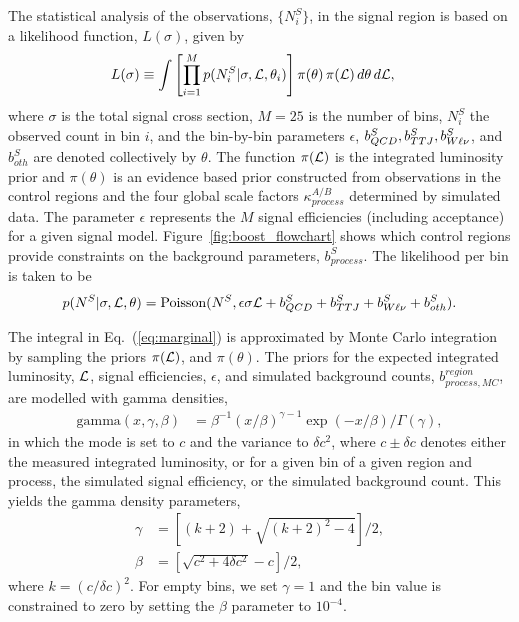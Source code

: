 
The statistical analysis of the observations,  $\{ N^S_i \}$, in the signal region is based on a
likelihood function, $L(\sigma)$, given by
\begin{align}
  L(\sigma) & \equiv  \int   \left[ \prod_{i=1}^M p(N^S_i | \sigma, {\cal L}, \theta_i)  \right] 
\pi(\theta) \, \pi({\cal L}) \, d\theta \, d{\cal L},
\label{eq:marginal}
\end{align}
where $\sigma$ is the total signal cross section, $M = 25$ is the number of bins, $N^S_i$ the
observed count in bin $i$, and the bin-by-bin parameters  $\epsilon$,  $b^S_{QCD}, b^S_{TTJ},
b^S_{W\ell\nu}$, and $b^S_{oth}$ are  denoted collectively by $\theta$. 
The function $\pi({\cal L})$ is the integrated luminosity prior and $\pi(\theta)$ is an evidence
based prior constructed from observations in the control regions and the four global scale factors
$\kappa^{A/B}_{process}$ determined by simulated data. 
The parameter $\epsilon$ represents the $M$ signal efficiencies (including acceptance) for a given
signal model. Figure~\ref{fig:boost_flowchart} shows which control regions provide constraints on
the background parameters, $b^S_{process}$.
The likelihood per bin is taken to be
\begin{equation}
 p(N^S | \sigma, {\cal L}, \theta) = \textrm{Poisson}(N^S,  \epsilon \sigma {\cal L} + b^S_{QCD} +
b^S_{TTJ} + b^S_{W\ell\nu} +  b^{S}_{oth}) .
\end{equation}

The integral in Eq.~(\ref{eq:marginal}) is approximated by Monte Carlo integration by sampling
 the priors $\pi({\cal L})$, and  $\pi(\theta)$. 
The priors for the expected integrated luminosity, ${\cal L}$, signal efficiencies, $\epsilon$, and 
simulated background counts, $b^{region}_{process, MC}$, are modelled with gamma densities,
\begin{align}
\textrm{gamma}(x, \gamma, \beta) &= \beta^{-1}(x/\beta)^{\gamma-1} \exp(-x / \beta) /
\Gamma(\gamma),
\label{eq:gamma}
\end{align}
in which the mode is set to $c$ and the variance to $\delta c^2$, 
where $c \pm \delta c$ denotes either the measured integrated luminosity, or for a given bin of
a given region and process, the simulated signal efficiency, or the simulated background count. This
yields the gamma density parameters,
\begin{align}
   \gamma &= [(k + 2) + \sqrt{(k+2)^2 - 4}]/2,\\
   \beta &= [\sqrt{c^2 + 4\delta c^2} - c]/2,
\end{align}
where $k = (c / \delta c)^2$.
For empty bins, we set $\gamma = 1$ and the bin value is constrained to zero by setting the $\beta$
parameter to $10^{-4}$.
 
